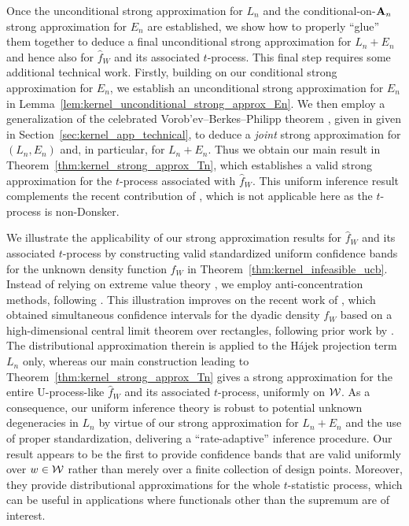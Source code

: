 Once the unconditional strong approximation for $L_n$ and the
conditional-on-$\mathbf{A}_n$ strong approximation for $E_n$ are established, we show
how to properly ``glue'' them together to deduce a final unconditional strong
approximation for $L_n+E_n$ and hence also for $\hat{f}_W$ and its associated
$t$-process. This final step requires some additional technical work. Firstly,
building on our conditional strong approximation for $E_n$, we establish an
unconditional strong approximation for $E_n$ in
Lemma~\ref{lem:kernel_unconditional_strong_approx_En}.
We then employ a generalization
of the celebrated Vorob'ev--Berkes--Philipp theorem \citep{dudley1999uniform},
given in given in Section~\ref{sec:kernel_app_technical}, to deduce a
\emph{joint}
strong approximation for $(L_n,E_n)$ and, in particular, for $L_n+E_n$. Thus we
obtain our main result in Theorem~\ref{thm:kernel_strong_approx_Tn},
which establishes
a valid strong approximation for the $t$-process associated with $\hat{f}_W$.
This uniform inference result complements the recent contribution of
\citet{davezies2021exchangeable}, which is not applicable here as
the $t$-process is non-Donsker.

We illustrate the applicability of our strong approximation results for
$\hat{f}_W$ and its associated $t$-process by constructing valid standardized
uniform confidence bands for the unknown density function $f_W$
in Theorem~\ref{thm:kernel_infeasible_ucb}. Instead of
relying on extreme value theory \citep*[as in][]{gine2004kernel}, we employ
anti-concentration methods, following \citet{chernozhukov2014anti}. This
illustration improves on the recent work of \citet{chiang2022inference}, which
obtained simultaneous confidence intervals for the dyadic density $f_W$ based
on a high-dimensional central limit theorem over rectangles, following prior
work by \citet{chernozhukov2017central}. The distributional
approximation therein is applied to the H\'{a}jek projection term $L_n$ only,
whereas our main construction leading to
Theorem~\ref{thm:kernel_strong_approx_Tn}
gives a strong approximation for the entire U-process-like $\hat{f}_W$ and its
associated $t$-process, uniformly on $\mathcal{W}$. As a consequence, our uniform
inference theory is robust to potential unknown degeneracies in $L_n$ by virtue
of our strong approximation for $L_n+E_n$ and the use of proper standardization,
delivering a ``rate-adaptive'' inference procedure. Our result appears to be
the first to provide confidence bands that are valid uniformly over $w \in \mathcal{W}$
rather than merely over a finite collection of design points. Moreover, they
provide distributional approximations for the whole $t$-statistic process,
which can be useful in applications where functionals other than the supremum
are of interest.


